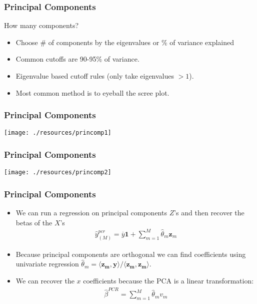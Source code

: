 \documentclass[xcolor=pdftex,dvipsnames,table,mathserif,aspectratio=169]{beamer}
\begin{document}
\begin{frame}
\frametitle{Principal Components}
How many components?
\begin{itemize}
\item Choose \# of components by the eigenvalues or \% of variance explained
\item Common cutoffs are 90-95\% of variance.
\item Eigenvalue based cutoff rules (only take eigenvalues $ > 1$).
\item Most common method is to eyeball the scree plot.
\end{itemize}
\end{frame}


\begin{frame}
\frametitle{Principal Components}
\begin{center}
\texttt{[image: ./resources/princomp1]}
\end{center}
\end{frame}

\begin{frame}
\frametitle{Principal Components}
\begin{center}
\texttt{[image: ./resources/princomp2]}
\end{center}
\end{frame}

\begin{frame}
\frametitle{Principal Components}
\begin{itemize}
\item We can run a regression on principal components $Z$'s and then recover the betas of the $X$'s
\begin{eqnarray*}
\hat{y}_{(M)}^{pcr} = \overline{y} \mathbf{1} + \sum_{m=1}^M \hat{\theta}_m \mathbf{z}_m
\end{eqnarray*}
\item Because principal components are orthogonal we can find coefficients using univariate regression $\hat{\theta}_m = \langle \mathbf{z_m} , \mathbf{y} \rangle / \langle \mathbf{z_m} , \mathbf{z_m} \rangle$.
\item We can recover the $x$ coefficients because the PCA is a linear transformation:
\begin{eqnarray*}
\hat{\beta}^{PCR} = \sum_{m=1}^M \hat{\theta}_m v_m
\end{eqnarray*}
\end{itemize}
\end{frame}
\end{document}
